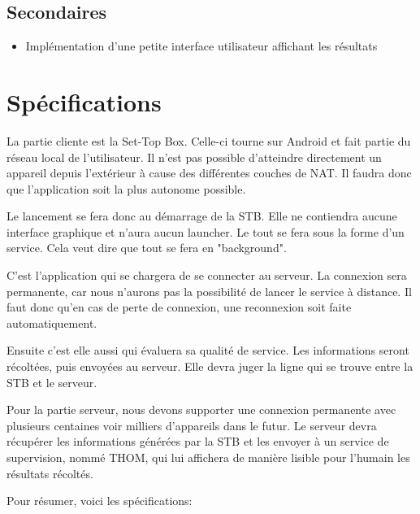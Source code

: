 \documentclass[a4paper, 12pt, svgnames]{report}
\begin{document}
\subsection{Secondaires}
\begin{itemize}
	\item Implémentation d'une petite interface utilisateur affichant les résultats
\end{itemize}

\section{Spécifications}
La partie cliente est la Set-Top Box. Celle-ci tourne sur Android et fait partie du réseau local de l'utilisateur. Il n'est pas possible d'atteindre directement un appareil depuis l'extérieur à cause des différentes couches de NAT. Il faudra donc que l'application soit la plus autonome possible. 

\medskip

Le lancement se fera donc au démarrage de la STB. Elle ne contiendra aucune interface graphique et n'aura aucun launcher. Le tout se fera sous la forme d'un service. Cela veut dire que tout se fera en "background".

\medskip

C'est l'application qui se chargera de se connecter au serveur. La connexion sera permanente, car nous n'aurons pas la possibilité de lancer le service à distance. Il faut donc qu'en cas de perte de connexion, une reconnexion soit faite automatiquement.

\medskip

Ensuite c'est elle aussi qui évaluera sa qualité de service. Les informations seront récoltées, puis envoyées au serveur. Elle devra juger la ligne qui se trouve entre la STB et le serveur.

\medskip

Pour la partie serveur, nous devons supporter une connexion permanente avec plusieurs centaines voir milliers d'appareils dans le futur. Le serveur devra récupérer les informations générées par la STB et les envoyer à un service de supervision, nommé THOM, qui lui affichera de manière lisible pour l'humain les résultats récoltés.

\medskip

Pour résumer, voici les spécifications:

\medskip
\end{document}

